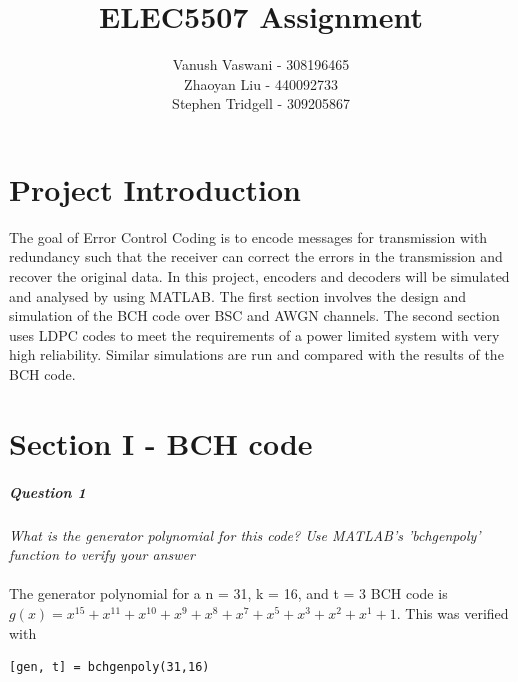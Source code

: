 \documentclass[a4paper]{article}
\begin{document}
\title{ELEC5507 Assignment}
\author{Vanush Vaswani - 308196465 \\
Zhaoyan Liu - 440092733 \\
Stephen Tridgell - 309205867}

\maketitle
\newpage


\lstset{language=Matlab, frame=single, breaklines=true, keepspaces=true, columns=flexible, basicstyle=\ttfamily\footnotesize}
\newpage

\part*{Project Introduction}

The goal of Error Control Coding is to encode messages for transmission with redundancy such that the receiver can correct the errors in the transmission and recover the original data. In this project, encoders and decoders will be simulated and analysed by using MATLAB. The first section involves the design and simulation of the BCH code over BSC and AWGN channels. The second section uses LDPC codes to meet the requirements of a power limited system with very high reliability. Similar simulations are run and compared with the results of the BCH code.

\part*{Section I - BCH code}

\subsubsection{Question 1} \textit{What is the generator polynomial for this code? Use MATLAB’s ’bchgenpoly’ function to verify your answer} \\
\\
The generator polynomial for a n = 31, k = 16, and t = 3 BCH code is $g(x) = x^{15} + x^{11} + 
x^{10} + x^{9} + x^{8} + x^{7} + x^{5} + x^{3} + x^{2} + x^{1} + 1$. 
This was verified with 
\begin{lstlisting}
[gen, t] = bchgenpoly(31,16)
\end{lstlisting}
\end{document}
